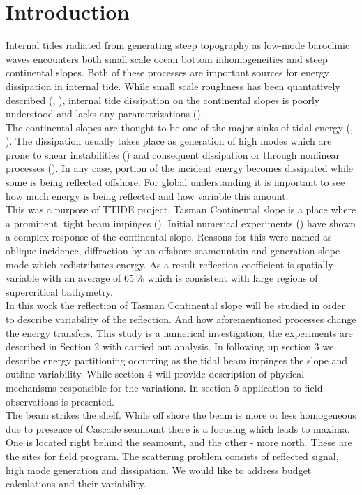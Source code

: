 \section{Introduction}
Internal tides radiated from generating steep topography as low-mode baroclinic waves encounters both small scale ocean bottom inhomogeneities and steep continental slopes. Both of these processes are important sources for energy dissipation in internal tide. While small scale roughness has been quantatively described (\cite{bell1977decay}, \cite{buhler2011decay}), internal tide dissipation on the continental slopes is poorly understood and lacks any parametrizations (\cite{eden2014energy}).\\
The continental slopes are thought to be one of the major sinks of tidal energy (\cite{kelly2012cascade}, \cite{klymak2011breaking}). The dissipation usually takes place as generation of high modes which are prone to shear instabilities (\cite{klymak2013parameterizing}) and consequent dissipation or through nonlinear processes (\cite{lamb2014internal}). In any case, portion of the incident energy becomes dissipated while some is being reflected offshore. For global understanding it is important to see how much energy is being reflected and how variable this amount.\\
This was a purpose of TTIDE project. Tasman Continental slope is a place where a prominent, tight beam impinges (\cite{pinkel2015breaking}). Initial numerical experiments (\cite{klymak2016reflection}) have shown a complex response of the continental slope. Reasons for this were named as oblique incidence, diffraction by an offshore seamountain and generation slope mode which redistributes energy. As a result reflection coefficient is spatially variable with an average of $65~\%$ which is consistent with large regions of supercritical bathymetry.\\
In this work the reflection of Tasman Continental slope will be studied in order to describe variability of the reflection. And how aforementioned processes change the energy transfers. This study is a numerical investigation, the experiments are described in Section 2 with carried out analysis. In following up section 3 we describe energy partitioning occurring as the tidal beam impinges the slope and outline variability. While section 4 will provide description of physical mechanisms responsible for the variations. In section 5 application to field observations is presented.\\

The beam strikes the shelf. While off shore the beam is more or less homogeneous due to presence of Cascade seamount there is a focusing which leads to maxima. One is located right behind the seamount, and the other - more north. These are the sites for field program. The scattering problem consists of reflected signal, high mode generation and dissipation. We would like to address budget calculations and their variability.

